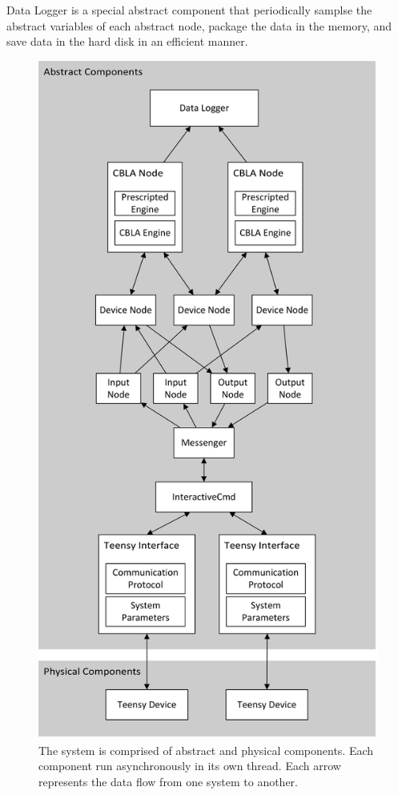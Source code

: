 Data Logger is a special abstract component that periodically samplse the abstract variables of each abstract node, package the data in the memory, and save data in the hard disk in an efficient manner. 


\begin{figure}
\centering
\includegraphics[height=0.85 \textheight]{"fig/interactive control system/high-level system architecture"}
\caption[High-level system architecture]{The system is comprised of abstract and physical components. Each component run asynchronously in its own thread. Each arrow represents the data flow from one system to another.}
\label{fig:system-architecture}
\end{figure}



